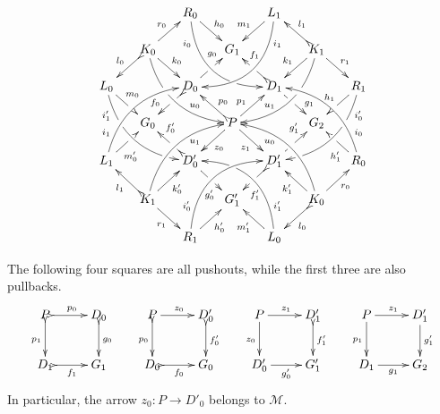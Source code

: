 \begin{lemma}
\begin{enumerate}
		\[\xymatrix@C=15pt@R=15pt{&&R_0 \ar@/_.8cm/[ddrr]_(.2){i_0}|(.7)\hole
			\ar[dr]^{h_0}&& L_1\ar@/^.8cm/[ddll]^(.2){i_1}
			\ar[dl]_{m_1}\\&K_0\ar[dr]^{k_0}\ar@{>->}[dl]_{l_0}
			\ar@/_.6cm/[ddrr]|(.36)\hole^(.65){u_0}\ar[ur]^{r_0}&& G_1 &&
			K_1
			\ar@/^.6cm/[ddll]|(.36)\hole_(.65){u_1}\ar[dl]_{k_1}\ar@{>->}[lu]_{l_1}
			\ar[dr]^{r_1}\\L_0
			\ar@/_.6cm/[ddrr]_(.2){i'_1}|(.31)\hole|(.81)\hole
			\ar[dr]^(.4){m_0}|(.61)\hole && D_0
			\ar@{>->}[dl]|(.4)\hole_(.65){f_0}\ar[ur]|(.5)\hole^(.7){g_0}&&D_1
			\ar[dr]|(.4)\hole^(.65){g_1}
			\ar@{>->}[ul]|(.5)\hole_(.65){f_1}&&R_1\ar@/^.6cm/[ddll]^(.2){i'_0}|(.31)\hole|(.81)\hole\ar[dl]_{h_1}|(.6)\hole\\&G_0
			&&P\ar@{>}[dr]_{z_1}	\ar@{>}[dl]^{z_0}\ar[ur]^(.4){p_1}\ar@{>->}[ul]_(.4){p_0}&&G_2\\L_1	\ar@/^.6cm/[uurr]^(.2){i_1} \ar[ur]_(.35){m'_0}|(.61)\hole && D'_0	\ar@{>->}[ul]|(.4)\hole_(.65){f'_0}\ar[dr]|(.5)\hole_(.65){g'_0}	&&D'_1\ar[ur]|(.4)\hole^(.65){g'_1} \ar@{>->}[dl]|(.5)\hole^(.65){f'_1}	&& R_0 \ar[ul]^(.35){h'_1}|(.61)\hole\ar@/_.6cm/[uull]_(.2){i_0}\\ &K_1	\ar[ur]_{k'_0} \ar[dr]_{r_1}	\ar@{>->}[ul]^{l_1}\ar@/^.6cm/[uurr]_(.65){u_1}&&G'_1&& K_0\ar[ur]_{r_0} \ar[ul]^{k'_1} \ar@{>->}[dl]^{l_0} \ar@/_.6cm/[uull]^(.65){u_0}\\&& R_1	\ar[ur]_{h'_0}\ar@/^.8cm/[uurr]^(.2){i'_0}&& L_0 \ar[ul]^{m'_1} \ar@/_.8cm/[uull]_(.2){i'_1} |(.69)\hole }\] 
		
		The following four squares are all pushouts, while the first three are also pullbacks. 
		\[\xymatrix{P \ar@{>->}[r]^{p_0} \ar@{>->}[d]_{p_1}& D_0 \ar@{>->}[d]^{g_0}  & P \ar@{>}[r]^{z_0} \ar@{>->}[d]_{p_0}& D'_0 \ar@{>->}[d]^{f'_0} &  P \ar@{->}[d]_{z_0} \ar[r]^{z_1} & D'_1 \ar@{>->}[d]^{f'_1} & P\ar[r]^{z_1} \ar[d]_{p_1}&D'_1 \ar[d]^{g'_1}\\ D_1 \ar@{>->}[r]_{f_1} & G_1  & D_0 \ar@{>->}[r]_{f_0} & G_0 & D'_0 \ar[r]_{g'_0}& G'_1 & D_1 \ar[r]_{g_1}& G_2}\]	
		In particular, the arrow $z_0\colon P\to D'_0$ belongs to $\mathcal{M}$.
	\end{enumerate}
\end{lemma}
